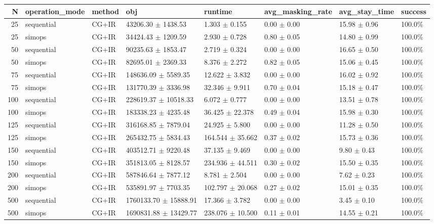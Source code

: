 \begin{tabular}{rlllllll}
\toprule
N & operation_mode & method & obj & runtime & avg_masking_rate & avg_stay_time & success \\
\midrule
25 & sequential & CG+IR & 43206.30 $\pm$ 1438.53 & 1.303 $\pm$ 0.155 & 0.00 $\pm$ 0.00 & 15.98 $\pm$ 0.96 & 100.0\% \\
25 & simops & CG+IR & 34424.43 $\pm$ 1209.59 & 2.930 $\pm$ 0.728 & 0.80 $\pm$ 0.05 & 14.80 $\pm$ 0.99 & 100.0\% \\
50 & sequential & CG+IR & 90235.63 $\pm$ 1853.47 & 2.719 $\pm$ 0.324 & 0.00 $\pm$ 0.00 & 16.65 $\pm$ 0.50 & 100.0\% \\
50 & simops & CG+IR & 82695.01 $\pm$ 2369.33 & 8.376 $\pm$ 2.272 & 0.82 $\pm$ 0.05 & 15.06 $\pm$ 0.45 & 100.0\% \\
75 & sequential & CG+IR & 148636.09 $\pm$ 5589.35 & 12.622 $\pm$ 3.832 & 0.00 $\pm$ 0.00 & 16.02 $\pm$ 0.92 & 100.0\% \\
75 & simops & CG+IR & 131770.39 $\pm$ 3336.98 & 32.346 $\pm$ 9.911 & 0.70 $\pm$ 0.04 & 15.18 $\pm$ 0.47 & 100.0\% \\
100 & sequential & CG+IR & 228619.37 $\pm$ 10518.33 & 6.072 $\pm$ 0.777 & 0.00 $\pm$ 0.00 & 13.51 $\pm$ 0.78 & 100.0\% \\
100 & simops & CG+IR & 183338.23 $\pm$ 4235.48 & 36.425 $\pm$ 22.378 & 0.49 $\pm$ 0.04 & 15.98 $\pm$ 0.30 & 100.0\% \\
125 & sequential & CG+IR & 316168.85 $\pm$ 7879.04 & 24.925 $\pm$ 5.800 & 0.00 $\pm$ 0.00 & 11.28 $\pm$ 0.50 & 100.0\% \\
125 & simops & CG+IR & 265432.75 $\pm$ 5834.43 & 164.544 $\pm$ 35.662 & 0.37 $\pm$ 0.02 & 15.73 $\pm$ 0.36 & 100.0\% \\
150 & sequential & CG+IR & 403512.71 $\pm$ 9220.48 & 37.135 $\pm$ 9.469 & 0.00 $\pm$ 0.00 & 9.80 $\pm$ 0.43 & 100.0\% \\
150 & simops & CG+IR & 351813.05 $\pm$ 8128.57 & 234.936 $\pm$ 44.511 & 0.30 $\pm$ 0.02 & 15.50 $\pm$ 0.35 & 100.0\% \\
200 & sequential & CG+IR & 587846.64 $\pm$ 7877.12 & 8.781 $\pm$ 2.504 & 0.00 $\pm$ 0.00 & 7.62 $\pm$ 0.23 & 100.0\% \\
200 & simops & CG+IR & 535891.97 $\pm$ 7703.35 & 102.797 $\pm$ 20.068 & 0.27 $\pm$ 0.02 & 15.01 $\pm$ 0.35 & 100.0\% \\
500 & sequential & CG+IR & 1760133.70 $\pm$ 15888.91 & 17.366 $\pm$ 3.782 & 0.00 $\pm$ 0.00 & 3.45 $\pm$ 0.10 & 100.0\% \\
500 & simops & CG+IR & 1690831.88 $\pm$ 13429.77 & 238.076 $\pm$ 10.500 & 0.11 $\pm$ 0.01 & 14.55 $\pm$ 0.21 & 100.0\% \\
\bottomrule
\end{tabular}
